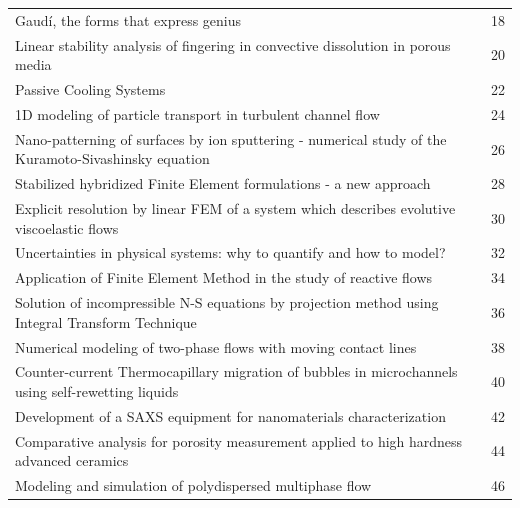 \documentclass[11pt,a4paper]{book} %
\begin{document}
\hspace{-8mm}
\begin{tabular}{lc}
	Gaudí, the forms that express genius & 18\\
	Linear stability analysis of fingering in convective dissolution in porous media & 20\\
	Passive Cooling Systems & 22\\
	1D modeling of particle transport in turbulent channel flow & 24\\
	Nano-patterning of surfaces by ion sputtering - numerical study of the Kuramoto-Sivashinsky equation & 26\\
	Stabilized hybridized Finite Element formulations - a new approach & 28\\
	Explicit resolution by linear FEM of a system which describes evolutive viscoelastic flows & 30\\
	Uncertainties in physical systems: why to quantify and how to model? & 32\\
	Application of Finite Element Method in the study of reactive flows & 34\\
	Solution of incompressible N-S equations by projection method using Integral Transform Technique & 36\\
	Numerical modeling of two-phase flows with moving contact lines & 38\\
	Counter-current Thermocapillary migration of bubbles in microchannels using self-rewetting liquids & 40\\
	Development of a SAXS equipment for nanomaterials characterization & 42\\
	Comparative analysis for porosity measurement applied to high hardness advanced ceramics & 44\\
	Modeling and simulation of polydispersed multiphase flow & 46\\
\end{tabular}


%
%
%
%
%
%
%
%
%
%
%
%
%
%
%
\end{document}
